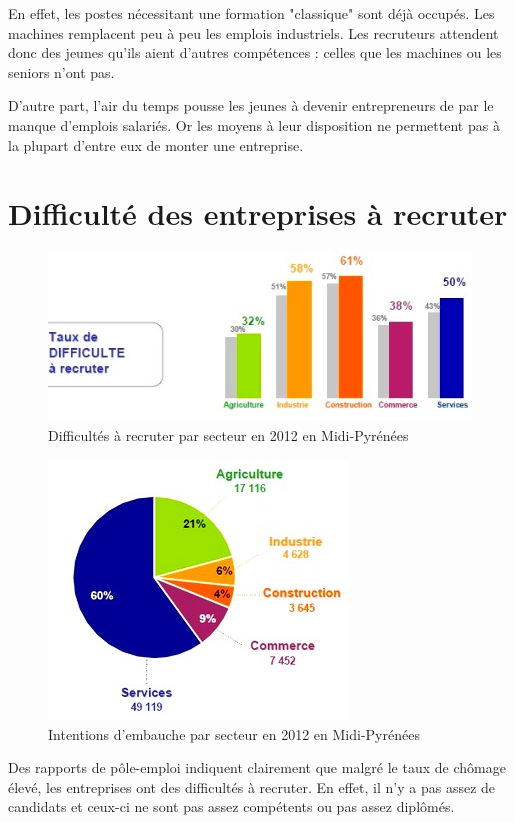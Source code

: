 En effet, les postes nécessitant une formation "classique" sont déjà occupés. Les machines remplacent peu à peu les emplois industriels. Les recruteurs attendent donc des jeunes qu'ils aient d'autres compétences : celles que les machines ou les seniors n'ont pas.

D'autre part, l'air du temps pousse les jeunes à devenir entrepreneurs de par le manque d'emplois salariés. Or les moyens à leur disposition ne permettent pas à la plupart d'entre eux de monter une entreprise.


\section{Difficulté des entreprises à recruter}
\begin{figure}[p]
\centering
\includegraphics[trim=7cm 0cm 0cm 0cm, clip=true, scale=1]{../resources/illustrations/diff_recrut}
\caption{Difficultés à recruter par secteur en 2012 en Midi-Pyrénées \cite{recrutement_midi_pyr}}
\label{diff_recrut}
\end{figure}
\begin{figure}[p]
\centering
\includegraphics[scale=0.8]{../resources/illustrations/embauches}
\caption{Intentions d'embauche par secteur en 2012 en Midi-Pyrénées \cite{recrutement_midi_pyr}}
\label{embauche}
\end{figure}
Des rapports de pôle-emploi indiquent clairement que malgré le taux de chômage élevé, les entreprises ont des difficultés à recruter. En effet, il n'y a pas assez de candidats et ceux-ci ne sont pas assez compétents ou pas assez diplômés. 

